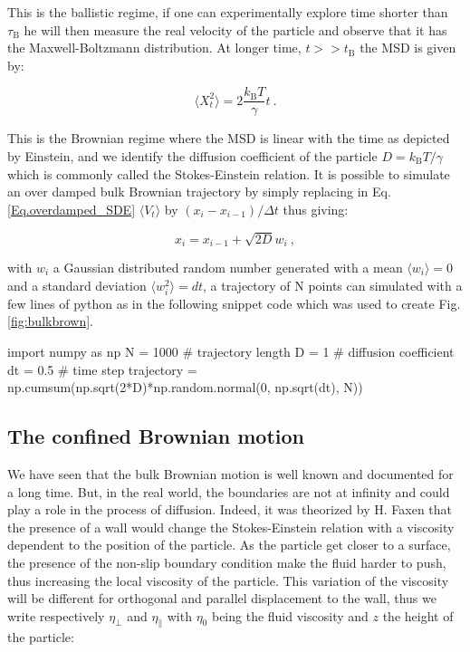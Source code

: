 This is the ballistic regime, if one can experimentally explore time shorter than $\tau _ \mathrm{B} $ he will then measure the real velocity of the particle and observe that it has the Maxwell-Boltzmann distribution. At longer time, $t >> t_\mathrm{B}$ the \gls{MSD} is given by:

\begin{equation}
	\langle X_t ^2 \rangle = 2 \frac{k_\mathrm{B}T}{\gamma} t ~.
\end{equation}

This is the Brownian regime where the \gls{MSD} is linear with the time as depicted by Einstein, and we identify the diffusion coefficient of the particle $ D = k_\mathrm{B} T / \gamma $ which is commonly called the Stokes-Einstein relation. It is possible to simulate an over damped bulk Brownian trajectory by simply replacing in Eq.\ref{Eq.overdamped_SDE} $\langle V_t \rangle $ by $(x_{i} - x_{i-1})/\Delta t $ thus giving:

\begin{equation}
	x_i = x_{i-1} + \sqrt{2D}w_i~,
\end{equation}

with $w_i$ a Gaussian distributed random number generated with a mean $\langle w_i \rangle = 0$ and a standard deviation $\langle w_i ^2 \rangle = dt$, a trajectory of N points can simulated with a few lines of python as in the following snippet code which was used to create Fig.\ref{fig:bulkbrown}.

\begin{python}
import numpy as np
N = 1000 # trajectory length
D = 1 # diffusion coefficient
dt = 0.5 # time step
trajectory = np.cumsum(np.sqrt(2*D)*np.random.normal(0, np.sqrt(dt), N))
\end{python}


\subsection{The confined Brownian motion}

We have seen that the bulk Brownian motion is well known and documented for a long time. But, in the real world, the boundaries are not at infinity and could play a role in the process of diffusion. Indeed, it was theorized by H. Faxen \cite{faxen_fredholm_1924} that the presence of a wall would change the Stokes-Einstein relation with a viscosity dependent to the position of the particle. As the particle get closer to a surface, the presence of the non-slip boundary condition make the fluid harder to push, thus increasing the local viscosity of the particle. This variation of the viscosity will be different for orthogonal and parallel displacement to the wall, thus we write respectively $\eta_\bot $ and $\eta_\parallel$ with $\eta_0$ being the fluid viscosity and $z$ the height of the particle:

